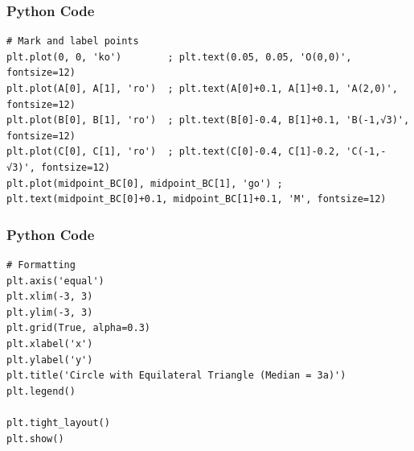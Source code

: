 \documentclass{beamer}
\numberwithin{equation}{section}
\begin{document}
\begin{frame}[fragile]
    \frametitle{Python Code}
    \begin{lstlisting}
# Mark and label points
plt.plot(0, 0, 'ko')        ; plt.text(0.05, 0.05, 'O(0,0)', fontsize=12)
plt.plot(A[0], A[1], 'ro')  ; plt.text(A[0]+0.1, A[1]+0.1, 'A(2,0)', fontsize=12)
plt.plot(B[0], B[1], 'ro')  ; plt.text(B[0]-0.4, B[1]+0.1, 'B(-1,√3)', fontsize=12)
plt.plot(C[0], C[1], 'ro')  ; plt.text(C[0]-0.4, C[1]-0.2, 'C(-1,-√3)', fontsize=12)
plt.plot(midpoint_BC[0], midpoint_BC[1], 'go') ; plt.text(midpoint_BC[0]+0.1, midpoint_BC[1]+0.1, 'M', fontsize=12)

\end{lstlisting}
\end{frame}


\begin{frame}[fragile]
    \frametitle{Python Code}
    \begin{lstlisting}
# Formatting
plt.axis('equal')
plt.xlim(-3, 3)
plt.ylim(-3, 3)
plt.grid(True, alpha=0.3)
plt.xlabel('x')
plt.ylabel('y')
plt.title('Circle with Equilateral Triangle (Median = 3a)')
plt.legend()

plt.tight_layout()
plt.show()

\end{lstlisting}
\end{frame}
\end{document}
